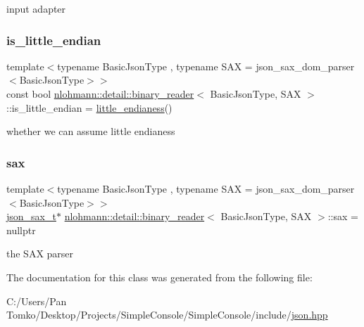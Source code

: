 input adapter 

\mbox{\label{classnlohmann_1_1detail_1_1binary__reader_aa846bdda08720535b26d8c90b939bc37}} 
\subsubsection{\texorpdfstring{is\_little\_endian}{is\_little\_endian}}
{\footnotesize\ttfamily template$<$typename Basic\+Json\+Type , typename S\+AX  = json\+\_\+sax\+\_\+dom\+\_\+parser$<$\+Basic\+Json\+Type$>$$>$ \\
const bool \mbox{\hyperlink{classnlohmann_1_1detail_1_1binary__reader}{nlohmann\+::detail\+::binary\+\_\+reader}}$<$ Basic\+Json\+Type, S\+AX $>$\+::is\+\_\+little\+\_\+endian = \mbox{\hyperlink{classnlohmann_1_1detail_1_1binary__reader_a1e31dbfcf9567c8c2d4f0e4eb1b0230a}{little\+\_\+endianess}}()\hspace{0.3cm}{\ttfamily [private]}}



whether we can assume little endianess 

\mbox{\label{classnlohmann_1_1detail_1_1binary__reader_ac9313177e414403e3e5784340d838b3f}} 
\subsubsection{\texorpdfstring{sax}{sax}}
{\footnotesize\ttfamily template$<$typename Basic\+Json\+Type , typename S\+AX  = json\+\_\+sax\+\_\+dom\+\_\+parser$<$\+Basic\+Json\+Type$>$$>$ \\
\mbox{\hyperlink{classnlohmann_1_1detail_1_1binary__reader_a43c5dc6a3219f64a7824d7ba9c7b14ae}{json\+\_\+sax\+\_\+t}}$\ast$ \mbox{\hyperlink{classnlohmann_1_1detail_1_1binary__reader}{nlohmann\+::detail\+::binary\+\_\+reader}}$<$ Basic\+Json\+Type, S\+AX $>$\+::sax = nullptr\hspace{0.3cm}{\ttfamily [private]}}



the S\+AX parser 



The documentation for this class was generated from the following file\+:\begin{DoxyCompactItemize}
\item 
C\+:/\+Users/\+Pan Tomko/\+Desktop/\+Projects/\+Simple\+Console/\+Simple\+Console/include/\mbox{\hyperlink{json_8hpp}{json.\+hpp}}\end{DoxyCompactItemize}
